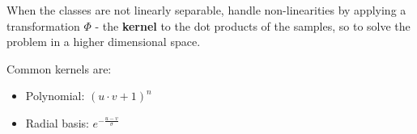 When the classes are not linearly separable, handle
non-linearities by applying a transformation $\Phi$ - the
\textbf{kernel} to the dot products of the samples, 
so to solve the problem in a higher dimensional space. 

Common kernels are:
\begin{itemize}
  \item Polynomial: $(u \cdot v + 1)^n$
  \item Radial basis: $e^{-\frac{u-v}{\sigma}}$
\end{itemize}
